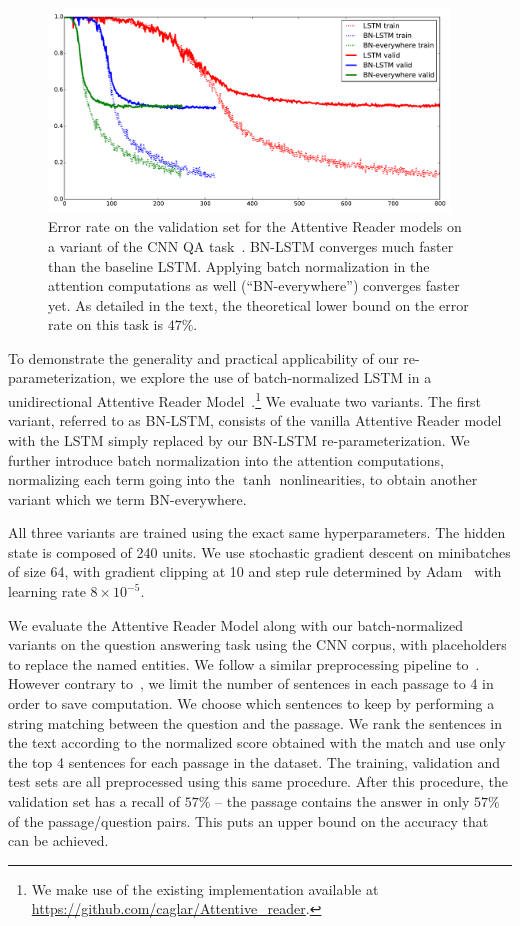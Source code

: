 \documentclass{article} %
\begin{document}
\begin{figure}
\center
\includegraphics[width=0.95\textwidth]{figures/attr_valid.pdf}
\caption{
Error rate on the validation set for the Attentive Reader models on a variant of the CNN QA task~\cite{attentivereader}.
BN-LSTM converges much faster than the baseline LSTM.
Applying batch normalization in the attention computations as well (``BN-everywhere'') converges faster yet.
As detailed in the text, the theoretical lower bound on the error rate on this task is $47\%$.
}
\label{fig:attr_valid}
\end{figure}

To demonstrate the generality and practical applicability of our re-parameterization,
we explore the use of batch-normalized LSTM in a unidirectional Attentive Reader Model~\cite{attentivereader}.\footnote{We make use of the existing implementation available at \url{https://github.com/caglar/Attentive_reader}.}
We evaluate two variants.
The first variant, referred to as BN-LSTM, consists of the vanilla Attentive Reader model with the LSTM simply replaced by our BN-LSTM re-parameterization.
We further introduce batch normalization into the attention computations, normalizing each term going into the $\tanh$ nonlinearities, to obtain another variant which we term BN-everywhere.

All three variants are trained using the exact same hyperparameters.
The hidden state is composed of 240 units.
We use stochastic gradient descent on minibatches of size 64,
with gradient clipping at 10 and step rule determined by Adam~\cite{kingma2014adam}
with learning rate $8 \times 10^{-5}$.

We evaluate the Attentive Reader Model along with our batch-normalized variants on the question answering task using the CNN corpus, with placeholders to replace the named entities. We follow a similar preprocessing pipeline to~\cite{attentivereader}.
However contrary to~\cite{attentivereader}, we limit the number of sentences in each passage to 4 in order to save computation.
We choose which sentences to keep by performing a string matching between the question and the passage.
We rank the sentences in the text according to the normalized score obtained with the match and use only the top 4 sentences for each passage in the dataset.
The training, validation and test sets are all preprocessed using this same procedure.
After this procedure, the validation set has a recall of $57\%$ -- the passage contains the answer in only $57\%$ of the passage/question pairs.
This puts an upper bound on the accuracy that can be achieved.
\end{document}
